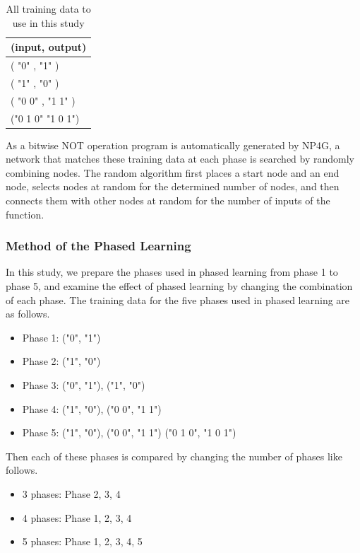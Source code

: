 \documentclass{article}
\begin{document}
\begin{table}[htbp]
\centering
\caption {All training data to use in this study}
\label{tbl:TeacherData}
\begin{tabular}{l}
\hline
(input, output) \\
\hline \hline
( "0" , "1" ) \\
( "1" , "0" ) \\
( "0 0" , "1 1" ) \\
("0 1 0" "1 0 1") \\
\hline
\end{tabular}
\end{table}

As a bitwise NOT operation program is automatically generated by NP4G, a network that matches these training data at each phase is searched by randomly combining nodes.
The random algorithm first places a start node and an end node, selects nodes at random for the determined number of nodes, and then connects them with other nodes at random for the number of inputs of the function.

\subsubsection {Method of the Phased Learning}
\label{sec:PLhow}
In this study, we prepare the phases used in phased learning from phase 1 to phase 5, and examine the effect of phased learning by changing the combination of each phase.
The training data for the five phases used in phased learning are as follows.

\begin{itemize}
\item Phase 1: ("0", "1")
\item Phase 2: ("1", "0")
\item Phase 3: ("0", "1"), ("1", "0")
\item Phase 4: ("1", "0"), ("0 0", "1 1")
\item Phase 5: ("1", "0"), ("0 0", "1 1") ("0 1 0", "1 0 1")
\end{itemize}

Then each of these phases is compared by changing the number of phases like follows.
\begin{itemize}
\item 3 phases:
Phase 2, 3, 4
\item 4 phases:
Phase 1, 2, 3, 4
\item 5 phases:
Phase 1, 2, 3, 4, 5
\end{itemize}
\noindent
\end{document}
